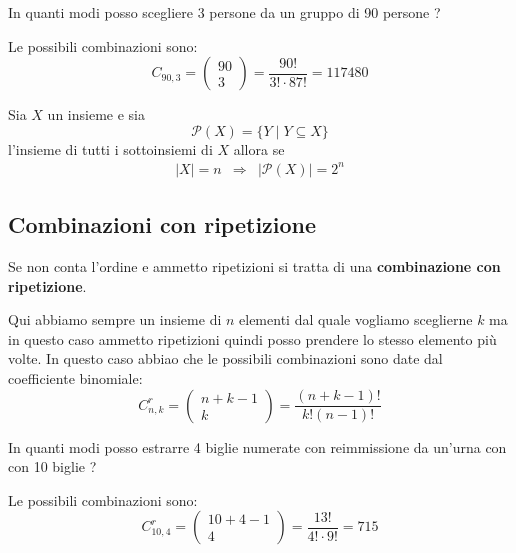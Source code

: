 \begin{example}
	In quanti modi posso scegliere 3 persone da un gruppo di 90 persone ?

	Le possibili combinazioni sono:
	\begin{equation*}
		C_{90, 3} =
		\begin{pmatrix}
			90 \\ 3
		\end{pmatrix} =
		\frac{90!}{3! \cdot 87!} = 117480
	\end{equation*}
\end{example}

\begin{theorem}
	Sia $X$ un insieme e sia
	\begin{equation*}
		\mathcal{P}(X) = \{ Y \mid Y \subseteq X \}
	\end{equation*}
	l'insieme di tutti i sottoinsiemi di $X$ allora se
	\begin{equation*}
		\begin{array}{ccc}
			|X| = n & \Rightarrow & |\mathcal{P}(X)| = 2^n
		\end{array}
	\end{equation*}
\end{theorem}

\subsection{Combinazioni con ripetizione}
\begin{defn}
	Se non conta l'ordine e ammetto ripetizioni si tratta di una
	\textbf{combinazione con ripetizione}.
\end{defn}

Qui abbiamo sempre un insieme di $n$ elementi dal quale vogliamo sceglierne $k$ ma in questo caso
ammetto ripetizioni quindi posso prendere lo stesso elemento pi\`u volte.
In questo caso abbiao che le possibili combinazioni sono date dal coefficiente binomiale:
\begin{equation*}
	C_{n, k}^r =
	\begin{pmatrix}
		n + k - 1 \\ k
	\end{pmatrix} =
	\frac{(n + k - 1)!}{k! (n - 1)!}
\end{equation*}

\begin{example}
	In quanti modi posso estrarre 4 biglie numerate con reimmissione da un'urna con con
	10 biglie ?

	Le possibili combinazioni sono:
	\begin{equation*}
		C_{10, 4}^r =
		\begin{pmatrix}
			10 + 4 - 1 \\ 4
		\end{pmatrix} =
		\frac{13!}{4! \cdot 9!} = 715
	\end{equation*}
\end{example}

